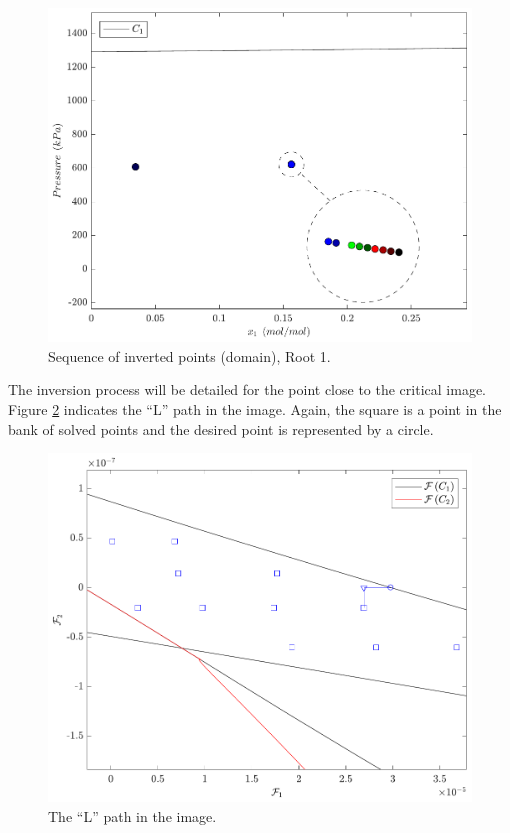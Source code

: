 \documentclass{article}
\theoremstyle{definition}
\theoremstyle{remark}
\begin{document}
\begin{figure}
	\begin{center}
		\includegraphics[scale=0.50]{sequencia_pontos_dominio_3.pdf}
		\caption{Sequence of inverted points (domain), Root 1.}\label{fig:points_domain_1}
	\end{center}
\end{figure}

The inversion process will be detailed for the point close to the critical image. Figure \ref{fig:L_path_image} indicates the ``L'' path in the image. Again, the square is a point in the bank of solved points and the desired point is represented by a circle.

\begin{figure}
	\begin{center}
		\includegraphics[scale=0.50]{caminho_L_degeneracao_imagem.pdf}
		\caption{The ``L'' path in the image.}\label{fig:L_path_image}
	\end{center}
\end{figure}
\end{document}
